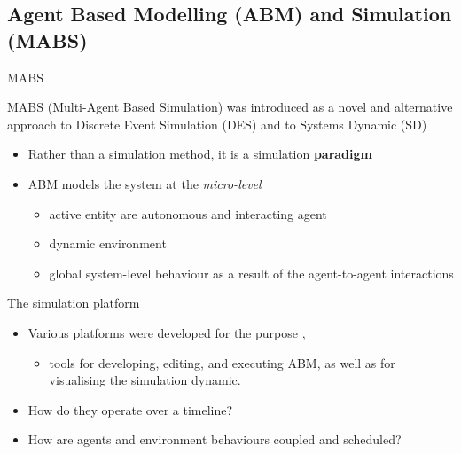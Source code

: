 \documentclass[presentation]{beamer} %
\begin{document}
\subsection{Agent Based Modelling (ABM) and Simulation (MABS)}

\begin{frame}[c,allowframebreaks]{MABS}

MABS (Multi-Agent Based Simulation) was introduced as a novel and alternative approach to Discrete Event Simulation (DES) and to Systems Dynamic (SD)

\begin{block}{}
	\begin{itemize}
		\item Rather than a simulation method, it is a simulation \textbf{paradigm}   
    		\item ABM models the system at the \emph{micro-level}
		\begin{itemize}
			\item active entity are autonomous and interacting agent
			\item dynamic environment
			\item global system-level behaviour as a result of the agent-to-agent interactions
		\end{itemize}
	\end{itemize}
\end{block}

\begin{block}{The simulation platform}
	\begin{itemize}
		\item Various platforms were developed for the purpose \cite{simulationtoolkits-survey}, 
		\begin{itemize}
			\item  tools for developing, editing, and executing ABM, as well as for visualising the simulation dynamic. 
		\end{itemize}
		\item How do they operate over a timeline?
		\item How are agents and environment behaviours coupled and scheduled?
	\end{itemize}
\end{block}


\end{frame}
\end{document}
